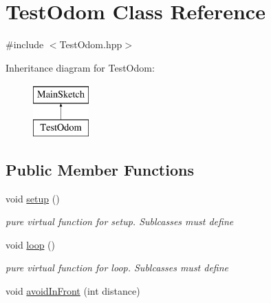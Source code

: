 \hypertarget{classTestOdom}{\section{Test\-Odom Class Reference}
\label{classTestOdom}
}


{\ttfamily \#include $<$Test\-Odom.\-hpp$>$}

Inheritance diagram for Test\-Odom\-:\begin{figure}[H]
\begin{center}
\leavevmode
\includegraphics[height=2.000000cm]{classTestOdom}
\end{center}
\end{figure}
\subsection*{Public Member Functions}
\begin{DoxyCompactItemize}
\item 
void \hyperlink{classTestOdom_ac468b764eecd5e27f3d1eb7667810230}{setup} ()
\begin{DoxyCompactList}\small\item\em pure virtual function for setup. Sublcasses must define \end{DoxyCompactList}\item 
void \hyperlink{classTestOdom_aa920dd334ddf70f766499f798ca57a8b}{loop} ()
\begin{DoxyCompactList}\small\item\em pure virtual function for loop. Sublcasses must define \end{DoxyCompactList}\item 
void \hyperlink{classTestOdom_a27f879657a8c2304e41d5495cf60b809}{avoid\-In\-Front} (int distance)
\end{DoxyCompactItemize}
